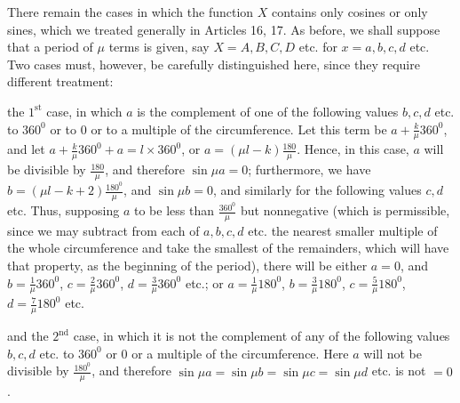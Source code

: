 \begingroup
\renewcommand{\arraystretch}{1.45}
There remain the cases in which the function $X$ contains only cosines or only sines, which we treated generally in Articles 16, 17. As before, we shall suppose that a period of $\mu$ terms is given, say $X=A,B,C,D$ etc. for $x=a,b,c,d$ etc. Two cases must, however, be carefully distinguished here, since they require different treatment:

the $1^{\mathrm{st}}$ case, in which $a$ is the complement of one of the following values $b,c,d$ etc. to $360^{0}$ or to $0$ or to a multiple of the circumference. Let this term be $a+\frac{k}{\mu}360^{0}$,
and let $a+\frac{k}{\mu}360^{0}+a=l\times360^{0}$, or $a=(\mu l-k)\frac{180}{\mu}$. Hence, in this case, $a$ will be divisible by $\frac{180}{\mu}$, and therefore $\sin\mu a=0$; furthermore, we have $b=(\mu l-k+2)\frac{180^{0}}{\mu}$, and $\sin\mu b=0$, and similarly for the following values $c,d$ etc. Thus, supposing $a$ to be less than $\frac{360^{0}}{\mu}$ but nonnegative (which is permissible, since we may subtract from each of $a,b,c,d$ etc. the nearest smaller multiple of the whole circumference and take the smallest of the remainders, which will have that property, as the beginning of the period), there will be either $a=0$, and $b=\frac1\mu360^{0}$, $c=\frac2\mu360^{0}$, $d=\frac3\mu360^{0}$ etc.; or $a=\frac1\mu180^{0}$, $b=\frac3\mu180^{0}$, $c=\frac5\mu180^{0}$, $d=\frac7\mu180^{0}$ etc.

and the $2^{\mathrm{nd}}$ case, in which it is not the complement of any of the following values $b,c,d$ etc. to $360^{0}$ or $0$ or a multiple of the circumference. Here $a$ will not be divisible by $\frac{180^{0}}{\mu}$, and therefore $\sin\mu a=\sin\mu b=\sin\mu c=\sin\mu d$ etc. is not $=0$.

